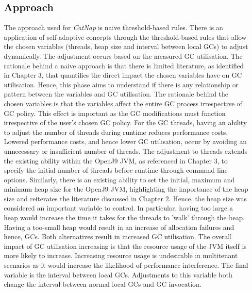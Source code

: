 \subsection{Approach}
The approach used for \emph{CatNap} is naive threshold-based rules. There is an
application of self-adaptive concepts through the threshold-based rules that allow the chosen variables (threads, heap size and interval between local GCs) to adjust dynamically. The adjustment occurs based on the measured GC utilisation. The rationale behind a naive approach is that
there is limited literature, as identified in Chapter 3, that quantifies
the direct impact the chosen variables have on GC utilisation. 
\newline\newline
Hence,
this phase aims to understand if there is any relationship or pattern
between the variables and GC utilisation. The rationale behind the
chosen variables is that the variables affect the entire GC process
irrespective of GC policy. This effect is important as the GC
modifications must function irrespective of the user's chosen GC policy.
For the GC threads, having an ability to adjust the number of threads
during runtime reduces performance costs. Lowered performance costs, and
hence lower GC utilisation, occur by avoiding an unnecessary or
insufficient number of threads. The adjustment to threads extends the
existing ability within the OpenJ9 JVM, as referenced in Chapter 3, to specify the initial number of
threads before runtime through command-line options.
\newline\newline
Similarly, there is an existing ability to set the initial, maximum and
minimum heap size for the OpenJ9 JVM, highlighting the importance of the
heap size and reiterates the literature discussed in Chapter 2. Hence,
the heap size was considered an important variable to control. In
particular, having too large a heap would increase the time it takes for
the threads to 'walk' through the heap. Having a too-small
heap would result in an increase of allocation failures and
hence, GCs. Both alternatives result in increased GC utilisation.
The overall impact of GC utilisation increasing is that the resource
usage of the JVM itself is more likely to increase. Increasing resource
usage is undesirable in multitenant scenarios as it would increase
the likelihood of performance interference. The final variable
is the interval between local GCs. Adjustments to this variable both
change the interval between normal local GCs and GC invocation.
